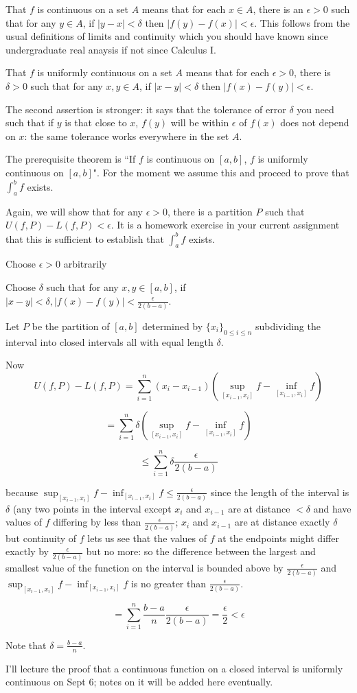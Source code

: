 \documentclass[12pt]{article}
\begin{document}
That $f$ is continuous on a set $A$ means that for each $x \in A$, there is an $\epsilon>0$ such that for any $y \in A$,
if $|y-x|<\delta$ then $|f(y)-f(x)|<\epsilon$.  This follows from the usual definitions of limits and continuity which you should have known since undergraduate real anaysis if not since Calculus I.

That $f$ is uniformly continuous on a set $A$ means that for each $\epsilon >0$, there is $\delta>0$ such that for any $x,y \in A$,
if $|x-y|<\delta$ then $|f(x)-f(y)|<\epsilon$.

The second assertion is stronger:  it says that the tolerance of error $\delta$ you need such that if $y$ is that close to $x$,
$f(y)$ will be within $\epsilon$ of $f(x)$ does not depend on $x$:  the same tolerance works everywhere in the set $A$.

The prerequisite theorem is ``If $f$ is continuous on $[a,b]$, $f$ is uniformly continuous on $[a,b]$".  For the moment we assume
this and proceed to prove that $\int_a^b f$ exists.

Again, we will show that for any $\epsilon > 0$, there is a partition $P$ such that $U(f,P) - L(f,P)<\epsilon$.  It is a homework exercise in your current assignment that this is sufficient to
establish that $\int_a^b f$ exists.

Choose $\epsilon >0$ arbitrarily

Choose $\delta$ such that for any $x,y \in [a,b]$, if $|x-y|<\delta, |f(x)-f(y)|< \frac\epsilon{2(b-a)}$.

Let $P$ be the partition of $[a,b]$ determined by $\{x_i\}_{0 \leq i \leq n}$ subdividing the interval into closed intervals all with equal length $\delta$.

Now $$U(f,P) - L(f,P) = \sum_{i=1}^n (x_i-x_{i-1})(\sup_{[x_{i-1},x_i]}f -\inf_{[x_{i-1},x_i]}f)$$

$$= \sum_{i=1}^n \delta(\sup_{[x_{i-1},x_i]}f -\inf_{[x_{i-1},x_i]}f)$$

$$\leq \sum_{i=1}^n \delta \frac{\epsilon}{2(b-a)}$$

because $\sup_{[x_{i-1},x_i]}f -\inf_{[x_{i-1},x_i]}f \leq \frac{\epsilon}{2(b-a)}$ since the length of the interval is $\delta$
(any two points in the interval except $x_i$ and $x_{i-1}$ are at distance $<\delta$ and have values of $f$ differing by less than $\frac{\epsilon}{2(b-a)}$;  $x_i$ and $x_{i-1}$ are at distance exactly $\delta$ but continuity of $f$ lets us see that the values of $f$ at the endpoints might differ exactly by $\frac{\epsilon}{2(b-a)}$ but no more:  so the difference between the largest and smallest value
of the function on the interval is bounded above by $\frac{\epsilon}{2(b-a)}$ and $\sup_{[x_{i-1},x_i]}f -\inf_{[x_{i-1},x_i]}f$ is no greater than $\frac{\epsilon}{2(b-a)}$.

$$= \sum_{i=1}^n \frac{b-a}n \frac  {\epsilon}{2(b-a)} = \frac\epsilon2 < \epsilon$$

Note that $\delta=\frac{b-a}n$.

I'll lecture the proof that a continuous function on a closed interval is uniformly continuous on Sept 6;  notes on it will be added here eventually.
\end{document}
